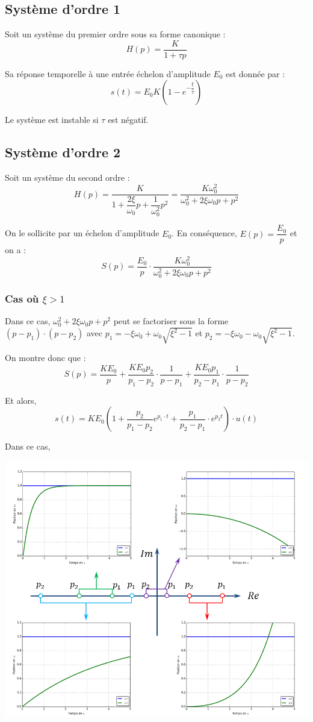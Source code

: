 \documentclass[10pt,fleqn]{article} %
\begin{document}
\subsection{Système d'ordre 1}
Soit un système du premier ordre sous sa forme canonique :
$$
H(p)=\dfrac{K}{1+\tau p}
$$

Sa réponse temporelle à une entrée échelon d'amplitude $E_0$ est donnée par :
$$
s(t) = E_0 K \left(1-e^{-\dfrac{t}{\tau}}\right)
$$

Le système est instable si $\tau$ est négatif.

\subsection{Système d'ordre 2}
Soit un système du second ordre :
$$
H(p)
=\dfrac{K}{1+\dfrac{2\xi}{\omega_0} p+\dfrac{1}{\omega_0^2} p^2}
=\dfrac{K\omega_0^2}{\omega_0^2+2\xi\omega_0 p+ p^2}
$$


On le sollicite par un échelon d'amplitude $E_0$. En conséquence, $E(p)=\dfrac{E_0}{p}$ et on a :
$$
S(p)=\dfrac{E_0}{p} \cdot \dfrac{K\omega_0^2}{\omega_0^2+2\xi\omega_0 p+ p^2}
$$

\subsubsection{Cas où $\xi>1$}
Dans ce cas, $\omega_0^2+2\xi\omega_0 p+ p^2$ peut se factoriser sous la forme $\left(p-p_1\right)\cdot\left(p-p_2\right)$ avec $p_1 = -\xi\omega_0 + \omega_0 \sqrt{\xi^2-1}$ et $p_2 = -\xi\omega_0 - \omega_0 \sqrt{\xi^2-1}$.

On montre donc que :
$$
S(p)= \dfrac{KE_0}{p} + \dfrac{KE_0 p_2}{p_1-p_2}\cdot \dfrac{1}{p-p_1}
+ \dfrac{KE_0 p_1}{p_2-p_1}\cdot \dfrac{1}{p-p_2}
$$

Et alors, 
$$
s(t) = KE_0\left(1+ \dfrac{ p_2}{p_1-p_2} e^{p_1 \cdot t} + \dfrac{p_1}{p_2-p_1}\cdot e^{p_2 t} \right) \cdot u(t)
$$


Dans ce cas, 

\begin{center}
 \includegraphics[width=.8\textwidth]{images/poles_1}
\end{center}
\end{document}

